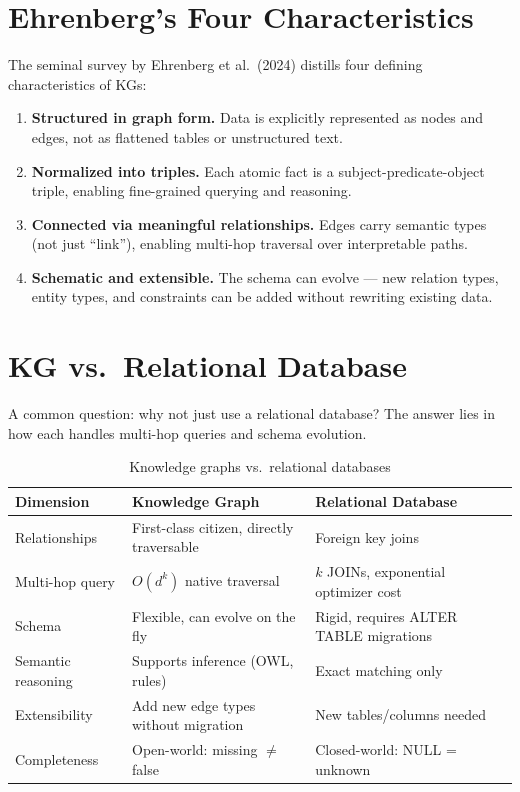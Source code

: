 \documentclass[11pt,a4paper,oneside,openany]{book}
\theoremstyle{definition}
\theoremstyle{plain}
\theoremstyle{remark}
\begin{document}
\section{Ehrenberg's Four Characteristics}

The seminal survey by Ehr\-en\-berg et al.~(2024) distills four defining characteristics of KGs:

\begin{enumerate}
	\item[\textbf{(1)}] \textbf{Structured in graph form.} Data is explicitly represented as nodes and edges, not as flattened tables or unstructured text.
	\item[\textbf{(2)}] \textbf{Normalized into triples.} Each atomic fact is a subject-predicate-object triple, enabling fine-grained querying and reasoning.
	\item[\textbf{(3)}] \textbf{Connected via meaningful relationships.} Edges carry semantic types (not just ``link''), enabling multi-hop traversal over interpretable paths.
	\item[\textbf{(4)}] \textbf{Schematic and extensible.} The schema can evolve --- new relation types, entity types, and constraints can be added without rewriting existing data.
\end{enumerate}

\section{KG vs.\ Relational Database}\label{sec:kg-vs-rdb}

A common question: why not just use a relational database? The answer lies in how each handles multi-hop queries and schema evolution.

\begin{table}[h]
	\centering
	\caption{Knowledge graphs vs.\ relational databases}
	\label{tab:kg-vs-rdb}
	\begin{tabular}{lp{5cm}p{6cm}}
		\toprule
		Dimension          & Knowledge Graph                           & Relational Database                    \\
		\midrule
		Relationships      & First-class citizen, directly traversable & Foreign key joins                      \\
		Multi-hop query    & $O(d^k)$ native traversal                 & $k$ JOINs, exponential optimizer cost  \\
		Schema             & Flexible, can evolve on the fly           & Rigid, requires ALTER TABLE migrations \\
		Semantic reasoning & Supports inference (OWL, rules)           & Exact matching only                    \\
		Extensibility      & Add new edge types without migration      & New tables/columns needed              \\
		Completeness       & Open-world: missing $\neq$ false          & Closed-world: NULL = unknown           \\
		\bottomrule
	\end{tabular}
\end{table}
\end{document}

